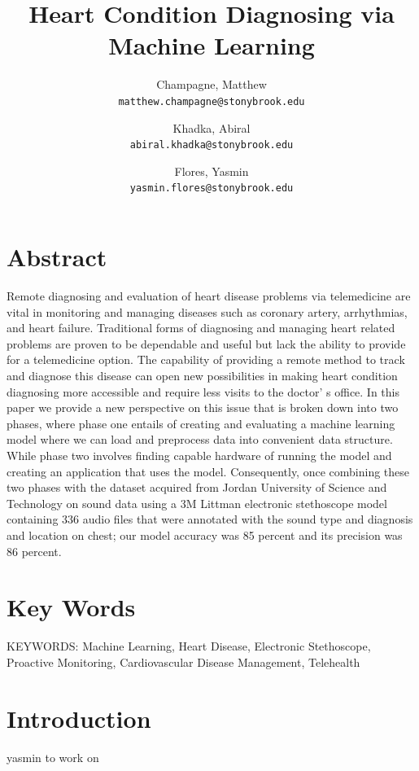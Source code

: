 \documentclass[twocolumn]{article}
\begin{document}
\title{Heart Condition Diagnosing via Machine Learning}
\author{
  Champagne, Matthew \\
  \texttt{matthew.champagne@stonybrook.edu}
  \and
  Khadka, Abiral \\
  \texttt{abiral.khadka@stonybrook.edu}
  \and
  Flores, Yasmin \\
  \texttt{yasmin.flores@stonybrook.edu}
}
\maketitle

\section{Abstract} 
Remote diagnosing and evaluation of heart disease problems via telemedicine are vital in monitoring 
and managing diseases such as coronary artery, arrhythmias, and heart failure. Traditional forms 
of diagnosing and managing heart related problems are proven to be dependable and useful 
but lack the ability to provide for a telemedicine option. The capability of providing 
a remote method to track and diagnose this disease can open new possibilities in 
making heart condition diagnosing more accessible and require less visits to the doctor’
s office. In this paper we provide a new perspective on this issue that 
is broken down into two phases, where phase one entails of creating and evaluating 
a machine learning model where we can load and preprocess data into convenient data 
structure. While phase two involves finding capable hardware of running the model and creating 
an application that uses the model. Consequently, once combining these two phases with the 
dataset acquired from Jordan University of Science and Technology on sound data using a 
3M Littman electronic stethoscope model containing 336 audio files that were annotated with the 
sound type and diagnosis and location on chest; our model accuracy was 85 percent and its precision was 86 percent. 

\section{Key Words} 
KEYWORDS: Machine Learning, Heart Disease, Electronic Stethoscope, Proactive Monitoring, Cardiovascular Disease Management, Telehealth 

\section{Introduction}
yasmin to work on 
\end{document}
